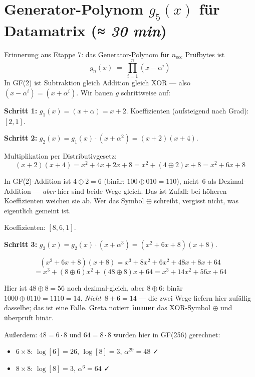 \section{Generator-Polynom $g_5(x)$ für Datamatrix
         \normalfont(\textit{≈ 30 min})}

Erinnerung aus Etappe 7: das Generator-Polynom für $n_{\text{ecc}}$
Prüfbytes ist
\[
  g_n(x) \;=\; \prod_{i=1}^{n} (x - \alpha^i)
\]
In GF(2) ist Subtraktion gleich Addition gleich XOR — also
$(x - \alpha^i) = (x + \alpha^i)$. Wir bauen $g$ schrittweise auf:

\textbf{Schritt 1:} $g_1(x) = (x + \alpha) = x + 2$.
Koeffizienten (aufsteigend nach Grad): $[2, 1]$.

\textbf{Schritt 2:} $g_2(x) = g_1(x) \cdot (x + \alpha^2)
                            = (x + 2)(x + 4)$.

Multiplikation per Distributivgesetz:
\[
  (x + 2)(x + 4) = x^2 + 4x + 2x + 8 = x^2 + (4 \oplus 2) x + 8
                 = x^2 + 6x + 8
\]

In GF(2)-Addition ist $4 \oplus 2 = 6$ (binär: $100 \oplus 010 = 110$),
nicht~$6$ als Dezimal-Addition — \emph{aber} hier sind beide Wege
gleich. Das ist Zufall: bei höheren Koeffizienten weichen sie ab.
Wer das Symbol $\oplus$ schreibt, vergisst nicht, was eigentlich
gemeint ist.

Koeffizienten: $[8, 6, 1]$.

\textbf{Schritt 3:} $g_3(x) = g_2(x) \cdot (x + \alpha^3) = (x^2 + 6x + 8)(x + 8)$.

\[
  (x^2 + 6x + 8)(x + 8)
  = x^3 + 8x^2 + 6x^2 + 48x + 8x + 64
\]
\[
  = x^3 + (8 \oplus 6) x^2 + (48 \oplus 8) x + 64
  = x^3 + 14 x^2 + 56 x + 64
\]

Hier ist $48 \oplus 8 = 56$ noch dezimal-gleich, aber $8 \oplus 6$:
binär $1000 \oplus 0110 = 1110 = 14$. \emph{Nicht}~$8+6=14$ — die
zwei Wege liefern hier zufällig dasselbe; das ist eine Falle. Greta
notiert \textbf{immer} das XOR-Symbol $\oplus$ und überprüft
binär.

Außerdem: $48 = 6 \cdot 8$ und $64 = 8 \cdot 8$ wurden hier in GF(256)
gerechnet:
\begin{itemize}
\item $6 \times 8$: $\log[6] = 26$, $\log[8] = 3$, $\alpha^{29} = 48$ ✓
\item $8 \times 8$: $\log[8] = 3$, $\alpha^{6} = 64$ ✓
\end{itemize}

